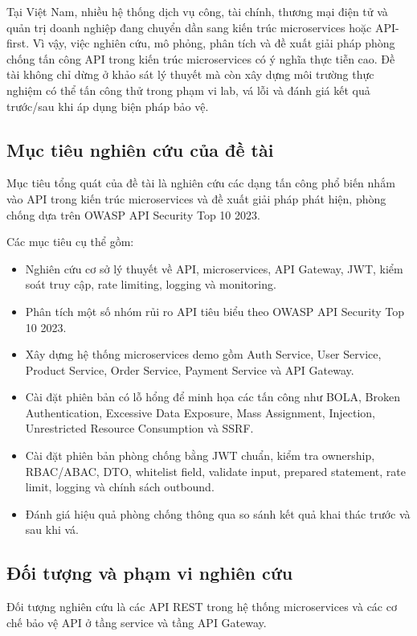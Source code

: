 \documentclass[14pt,a4paper]{extarticle}
\begin{document}
Tại Việt Nam, nhiều hệ thống dịch vụ công, tài chính, thương mại điện tử và quản trị doanh nghiệp đang chuyển dần sang kiến trúc microservices hoặc API-first. Vì vậy, việc nghiên cứu, mô phỏng, phân tích và đề xuất giải pháp phòng chống tấn công API trong kiến trúc microservices có ý nghĩa thực tiễn cao. Đề tài không chỉ dừng ở khảo sát lý thuyết mà còn xây dựng môi trường thực nghiệm có thể tấn công thử trong phạm vi lab, vá lỗi và đánh giá kết quả trước/sau khi áp dụng biện pháp bảo vệ.

\subsection{Mục tiêu nghiên cứu của đề tài}
Mục tiêu tổng quát của đề tài là nghiên cứu các dạng tấn công phổ biến nhắm vào API trong kiến trúc microservices và đề xuất giải pháp phát hiện, phòng chống dựa trên OWASP API Security Top 10 2023.

Các mục tiêu cụ thể gồm:
\begin{itemize}
  \item Nghiên cứu cơ sở lý thuyết về API, microservices, API Gateway, JWT, kiểm soát truy cập, rate limiting, logging và monitoring.
  \item Phân tích một số nhóm rủi ro API tiêu biểu theo OWASP API Security Top 10 2023.
  \item Xây dựng hệ thống microservices demo gồm Auth Service, User Service, Product Service, Order Service, Payment Service và API Gateway.
  \item Cài đặt phiên bản có lỗ hổng để minh họa các tấn công như BOLA, Broken Authentication, Excessive Data Exposure, Mass Assignment, Injection, Unrestricted Resource Consumption và SSRF.
  \item Cài đặt phiên bản phòng chống bằng JWT chuẩn, kiểm tra ownership, RBAC/ABAC, DTO, whitelist field, validate input, prepared statement, rate limit, logging và chính sách outbound.
  \item Đánh giá hiệu quả phòng chống thông qua so sánh kết quả khai thác trước và sau khi vá.
\end{itemize}

\subsection{Đối tượng và phạm vi nghiên cứu}
Đối tượng nghiên cứu là các API REST trong hệ thống microservices và các cơ chế bảo vệ API ở tầng service và tầng API Gateway.
\end{document}

